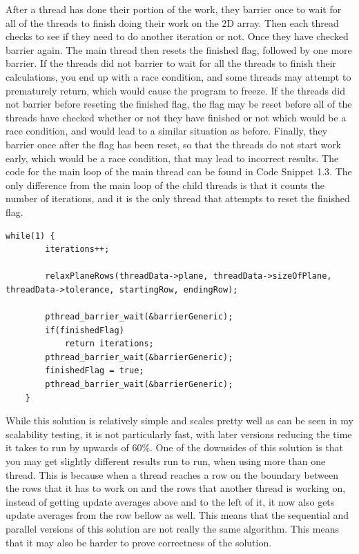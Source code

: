\documentclass{report}
\begin{document}
After a thread has done their portion of the work, they barrier once to wait for all of the threads to finish doing their work on the 2D array. Then each thread checks to see if they need to do another iteration or not. Once they have checked barrier again. The main thread then resets the finished flag, followed by one more barrier. If the threads did not barrier to wait for all the threads to finish their calculations, you end up with a race condition, and some threads may attempt to prematurely return, which would cause the program to freeze. If the threads did not barrier before reseting the finished flag, the flag may be reset before all of the threads have checked whether or not they have finished or not which would be a race condition, and would lead to a similar situation as before. Finally, they barrier once after the flag has been reset, so that the threads do not start work early, which would be a race condition, that may lead to incorrect results. The code for the main loop of the main thread can be found in Code Snippet 1.3. The only difference from the main loop of the child threads is that it counts the number of iterations, and it is the only thread that attempts to reset the finished flag.
\begin{lstlisting}[style=customc,caption=Version 1 Parallel Main Loop]
    while(1) {
        iterations++;

        relaxPlaneRows(threadData->plane, threadData->sizeOfPlane, threadData->tolerance, startingRow, endingRow);

        pthread_barrier_wait(&barrierGeneric);
        if(finishedFlag)
            return iterations;
        pthread_barrier_wait(&barrierGeneric);
        finishedFlag = true;
        pthread_barrier_wait(&barrierGeneric);
    }
\end{lstlisting}
While this solution is relatively simple and scales pretty well as can be seen in my scalability testing, it is not particularly fast, with later versions reducing the time it takes to run by upwards of 60\%. One of the downsides of this solution is that you may get slightly different results run to run, when using more than one thread. This is because when a thread reaches a row on the boundary between the rows that it has to work on and the rows that another thread is working on, instead of getting update averages above and to the left of it, it now also gets update averages from the row bellow as well. This means that the sequential and parallel versions of this solution are not really the same algorithm. This means that it may also be harder to prove correctness of the solution.
\end{document}
